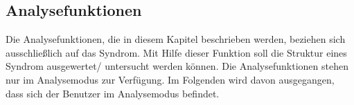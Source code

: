 \documentclass[enabledeprecatedfontcommands,fontsize=11pt,paper=a4,twoside]{scrartcl}
\newcounter{one}
\begin{document}
\subsection{Analysefunktionen} \label{analyse}
Die Analysefunktionen, die in diesem Kapitel beschrieben werden, beziehen sich ausschließlich auf das Syndrom. Mit Hilfe dieser Funktion soll die Struktur eines Syndrom ausgewertet/ untersucht werden können. Die Analysefunktionen stehen nur im Analysemodus zur Verfügung. Im Folgenden wird davon ausgegangen, dass sich der Benutzer im Analysemodus befindet.

\begin{figure}[ht!]
	\centering
\end{figure}

\begin{figure}[ht!]
	\centering
\end{figure}
\end{document}
